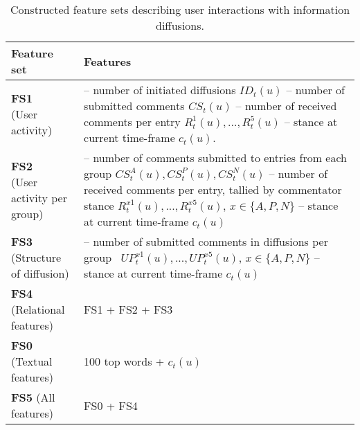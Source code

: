 %
\begin{table}[tbp]
	\small
	\newcommand\widthcellone{4cm} %
	\newcommand\widthcelltwo{8cm} %
	\renewcommand\cellgape{\Gape[2pt]}
	\centering
	\caption{Constructed feature sets describing user interactions with information diffusions.}
	\label{tab:constructed-features}
	\begin{tabular}{p{\widthcellone}p{\widthcelltwo}}
		\toprule
		\textbf{Feature set} & \textbf{Features} \\ \midrule
		\makecell[t{p{\widthcellone}}]{\textbf{FS1}\\(User activity)} & \makecell[t{p{\widthcelltwo}}]{
			-- number of initiated diffusions $ID_t(u)$ \\
			-- number of submitted comments $CS_t(u)$\\
			-- number of received comments per entry $R_t^1(u),...,R_t^5(u)$\\
			-- stance at current time-frame $c_t(u)$.} \\ 
			
	\makecell[t{p{\widthcellone}}]{\textbf{FS2}\\(User activity per group)} & \makecell[t{p{\widthcelltwo}}]{
			-- number of comments submitted to entries from each group $CS_t^A(u), CS_t^P(u), CS_t^N(u)$\\
			-- number of received comments per entry, tallied by commentator stance $R_t^{x1}(u),..., R_t^{x5}(u)$,  $x \in \{A, P, N\}$\\
			-- stance at current time-frame $c_t(u)$\\
			}\\ 
			
		\makecell[t{p{\widthcellone}}]{\textbf{FS3}\\(Structure of diffusion)} & \makecell[t{p{\widthcelltwo}}]{
			-- number of submitted comments in diffusions per group \	$UP_t^{x1}(u), ..., UP_t^{x5}(u)$, $x \in \{A, P, N\}$\\
			-- stance at current time-frame $c_t(u)$}\\
			
			
		\textbf{FS4} (Relational features) & FS1 + FS2 + FS3 \\
	
		\textbf{FS0} (Textual features) & 100 top words + $c_t(u)$ \\
		
		\textbf{FS5} (All features) & FS0 + FS4 \\
		
		\bottomrule
\end{tabular}
\end{table}